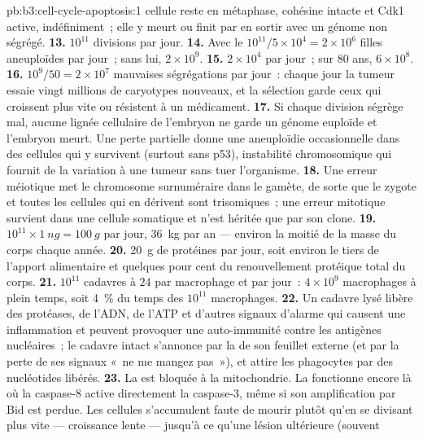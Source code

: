 \begin{solution}{pb:b3:cell-cycle-apoptosis:1}
cellule reste en métaphase, cohésine intacte et Cdk1 active,
indéfiniment~; elle y meurt ou finit par en sortir avec un génome non
ségrégé.
\textbf{13.} $10^{11}$ divisions par jour.
\textbf{14.} Avec le  $10^{11}/5\times 10^{4} = 2\times 10^{6}$
filles aneuploïdes par jour~; sans lui, $2\times 10^{9}$.
\textbf{15.} $2\times 10^{4}$ par jour~; sur $80$ ans, $6\times 10^{8}$.
\textbf{16.} $10^{9}/50 = 2\times 10^{7}$ mauvaises ségrégations par
jour~: chaque jour la tumeur essaie vingt millions de caryotypes
nouveaux, et la sélection garde ceux qui croissent plus vite ou
résistent à un médicament.
\textbf{17.} Si chaque division ségrège mal, aucune lignée cellulaire
de l'embryon ne garde un génome euploïde et l'embryon meurt. Une perte
partielle donne une aneuploïdie occasionnelle dans des cellules qui y
survivent (surtout sans p53), instabilité chromosomique qui fournit de
la variation à une tumeur sans tuer l'organisme.
\textbf{18.} Une erreur méiotique met le chromosome surnuméraire dans
le gamète, de sorte que le zygote et toutes les cellules qui en
dérivent sont trisomiques~; une erreur mitotique survient dans une
cellule somatique et n'est héritée que par son clone.
\textbf{19.} $10^{11}\times \qty{1}{ng} = \qty{100}{g}$ par jour,
\qty{36}{kg} par an --- environ la moitié de la masse du corps chaque
année.
\textbf{20.} \qty{20}{g} de protéines par jour, soit environ le tiers de
l'apport alimentaire et quelques pour cent du renouvellement protéique
total du corps.
\textbf{21.} $10^{11}$ cadavres à $24$ par macrophage et par jour~:
$4\times
10^{9}$ macrophages à plein temps, soit \qty{4}{\%} du temps des
$10^{11}$ macrophages.
\textbf{22.} Un cadavre lysé libère des protéases, de l'ADN, de l'ATP
et d'autres signaux d'alarme qui causent une inflammation et peuvent
provoquer une auto-immunité contre les antigènes nucléaires~; le
cadavre intact s'annonce par la  de son feuillet
externe (et par la perte de ses signaux «~ne me mangez pas~»), et
attire les phagocytes par des nucléotides libérés.
\textbf{23.} La  est bloquée à la mitochondrie. La  fonctionne encore là où la caspase-8 active directement la
caspase-3, même si son amplification par Bid est perdue. Les cellules
s'accumulent faute de mourir plutôt qu'en se divisant plus vite ---
croissance lente --- jusqu'à ce qu'une lésion ultérieure (souvent

\end{solution}

